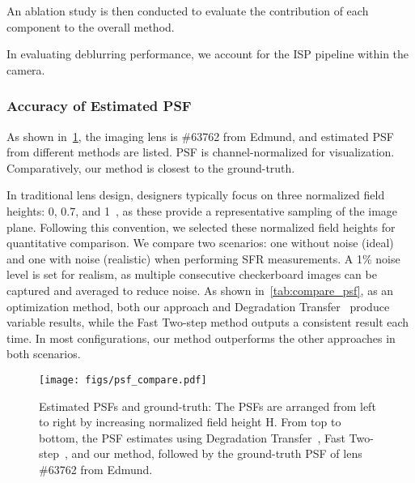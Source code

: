 An ablation study is then conducted to evaluate the contribution of each component to the overall method.

In evaluating deblurring performance, we account for the ISP pipeline within the camera.



\subsubsection{Accuracy of Estimated PSF}
\label{accuracy of estimate}

As shown in~\cref{fig:psf_compare}, the imaging lens is \#63762 from Edmund, and estimated PSF from different methods are listed. PSF is channel-normalized for visualization. Comparatively, our method is closest to the ground-truth.



In traditional lens design, designers typically focus on three normalized field heights: 0, 0.7, and 1~\cite{smith2008modern}, as these provide a representative sampling of the image plane. Following this convention, we selected these normalized field heights for quantitative comparison. We compare two scenarios: one without noise (ideal) and one with noise (realistic) when performing SFR measurements. A 1\% noise level is set for realism, as multiple consecutive checkerboard images can be captured and averaged to reduce noise. As shown in~\cref{tab:compare_psf}, as an optimization method, both our approach and Degradation Transfer~\cite{chen2021extreme} produce variable results, while the Fast Two-step method outputs a consistent result each time.  In most configurations, our method outperforms the other approaches in both scenarios.

\begin{figure}
\centering
\vspace{0.0cm} 
\hspace{-3mm}
    \texttt{[image: figs/psf\_compare.pdf]}
    \setlength{\abovecaptionskip}{0.3cm} 
    \caption{Estimated PSFs and ground-truth: The PSFs are arranged from left to right by increasing normalized field height $\mathrm{H}$. From top to bottom, the PSF estimates using Degradation Transfer~\cite{chen2021extreme}, Fast Two-step~\cite{eboli2022fast}, and our method, followed by the ground-truth PSF of lens \#63762 from Edmund.}
    \vspace{-0.2cm} 
    \label{fig:psf_compare}
\end{figure}


